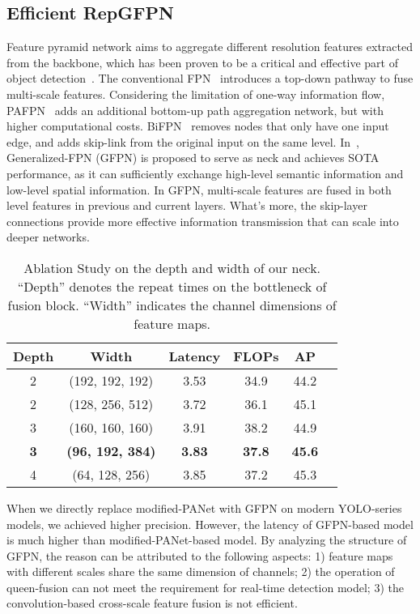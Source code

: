 \documentclass[10pt,twocolumn,letterpaper]{article}
\begin{document}
\subsection{Efficient RepGFPN} 
Feature pyramid network aims to aggregate different resolution features extracted from the backbone, which has been proven to be a critical and effective part of object detection~\cite{ghiasi2019fpn, wang2019panet, tan2020efficientdet}.
The conventional FPN~\cite{ghiasi2019fpn} introduces a top-down pathway to fuse multi-scale features. Considering the limitation of one-way information flow, PAFPN~\cite{wang2019panet} adds an additional bottom-up path aggregation network, but with higher computational costs. BiFPN~\cite{tan2020efficientdet} removes nodes that only have one input edge, and adds skip-link from the original input on the same level. 
In~\cite{jiang2022giraffedet}, Generalized-FPN (GFPN) is proposed to serve as neck and achieves SOTA performance, as it can sufficiently exchange high-level semantic information and low-level spatial information. 
In GFPN, multi-scale features are fused in both level features in previous and current layers. What's more, the  skip-layer connections provide more effective information transmission that can scale into deeper networks.
\begin{table}
    \begin{center}
    \caption{Ablation Study on the depth and width of our neck. ``Depth'' denotes the repeat times on the bottleneck of fusion block. ``Width'' indicates the channel dimensions of feature maps.}
    \label{tab:featuremap_scale}
    \setlength{\tabcolsep}{3pt}
    \begin{tabular}{c|ccccc}
    \toprule
    Depth & Width & Latency & FLOPs & AP    \\
    \midrule
    2 & (192, 192, 192) & 3.53 & 34.9 & 44.2    \\
    2 & (128, 256, 512) & 3.72 & 36.1 & 45.1    \\
    3 & (160, 160, 160) & 3.91 & 38.2 & 44.9     \\
    \textbf{3} & \textbf{(96, 192, 384)} & \textbf{3.83} & \textbf{37.8} & \textbf{45.6}  \\
    4 & (64, 128, 256) & 3.85 & 37.2 & 45.3     \\
    \bottomrule
    \end{tabular}
    \end{center}
\end{table}
When we directly replace modified-PANet with GFPN on modern YOLO-series models, we achieved higher precision. However, the latency of GFPN-based model is much higher than modified-PANet-based model. By analyzing the structure of GFPN, the reason can be attributed to the following aspects: 1) feature maps with different scales share the same dimension of channels; 2) the operation of queen-fusion can not meet the requirement for real-time detection model; 3) the convolution-based cross-scale feature fusion is not efficient.
\end{document}
